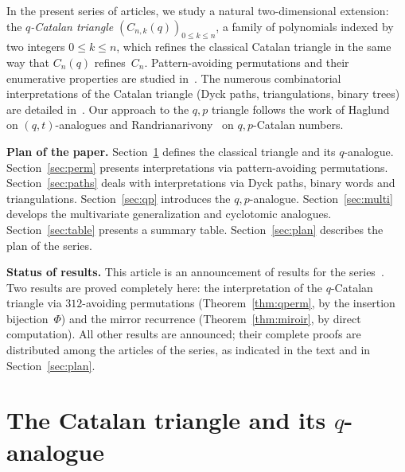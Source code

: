 \documentclass[12pt,a4paper,reqno]{amsart}
\theoremstyle{plain}
\theoremstyle{definition}
\begin{document}
In the present series of articles, we study a natural
two-dimensional extension: the \emph{$q$-Catalan triangle}
$(C_{n,k}(q))_{0\le k\le n}$, a family of polynomials indexed
by two integers $0\le k\le n$, which refines the classical
Catalan triangle in the same way that $C_n(q)$ refines~$C_n$.
Pattern-avoiding permutations and their enumerative properties
are studied in~\cite{Guibert,SS,Stanley1}.
The numerous combinatorial interpretations of the Catalan
triangle (Dyck paths, triangulations, binary trees)
are detailed in~\cite{Stanley2}.
Our approach to the $q{,}p$ triangle follows the work of
Haglund~\cite{Haglund} on $(q,t)$-analogues
and Randrianarivony~\cite{Rand} on $q{,}p$-Catalan numbers.

\medskip\noindent\textbf{Plan of the paper.}
Section~\ref{sec:triangle} defines the classical triangle
and its $q$-analogue.
Section~\ref{sec:perm} presents interpretations via
pattern-avoiding permutations.
Section~\ref{sec:paths} deals with interpretations via
Dyck paths, binary words and triangulations.
Section~\ref{sec:qp} introduces the $q{,}p$-analogue.
Section~\ref{sec:multi} develops the multivariate
generalization and cyclotomic analogues.
Section~\ref{sec:table} presents a summary table.
Section~\ref{sec:plan} describes the plan of the series.

\medskip\noindent\textbf{Status of results.}
This article is an announcement of results for the
series~\cite{W1,W2,W3,W4,W5}.
Two results are proved completely here:
the interpretation of the $q$-Catalan triangle via
$312$-avoiding permutations (Theorem~\ref{thm:qperm}, by the
insertion bijection~$\Phi$) and the mirror recurrence
(Theorem~\ref{thm:miroir}, by direct computation).
All other results are announced; their complete proofs
are distributed among the articles of the series,
as indicated in the text and in Section~\ref{sec:plan}.

\section{The Catalan triangle and its $q$-analogue}\label{sec:triangle}
\end{document}
